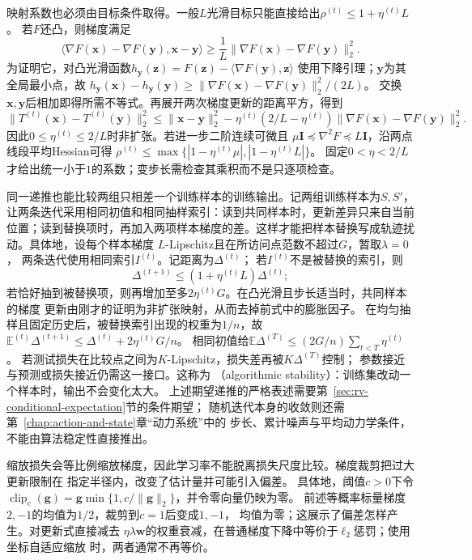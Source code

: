 映射系数也必须由目标条件取得。一般$L$光滑目标只能直接给出$\rho^{(t)}\leq1+\eta^{(t)}L$。
若$F$还凸，则梯度满足
\[
 \langle\nabla F(\bm x)-\nabla F(\bm y),\bm x-\bm y\rangle
 \geq\frac1L\|\nabla F(\bm x)-\nabla F(\bm y)\|_2^2.
\]
为证明它，对凸光滑函数$h_{\bm y}(\bm z)=F(\bm z)-\langle\nabla F(\bm y),\bm z\rangle$
使用下降引理；$\bm y$为其全局最小点，故
$h_{\bm y}(\bm x)-h_{\bm y}(\bm y)\geq
\|\nabla F(\bm x)-\nabla F(\bm y)\|_2^2/(2L)$。
交换$\bm x,\bm y$后相加即得所需不等式。再展开两次梯度更新的距离平方，得到
\[
 \|T^{(t)}(\bm x)-T^{(t)}(\bm y)\|_2^2
 \leq\|\bm x-\bm y\|_2^2
 -\eta^{(t)}(2/L-\eta^{(t)})\|\nabla F(\bm x)-\nabla F(\bm y)\|_2^2.
\]
因此$0\leq\eta^{(t)}\leq2/L$时非扩张。若进一步二阶连续可微且
$\mu\bm I\preceq\nabla^2F\preceq L\bm I$，沿两点线段平均Hessian可得
$\rho^{(t)}\leq\max\{|1-\eta^{(t)}\mu|,|1-\eta^{(t)}L|\}$。
固定$0<\eta<2/L$才给出统一小于$1$的系数；变步长需检查其乘积而不是只逐项检查。

同一递推也能比较两组只相差一个训练样本的训练输出。记两组训练样本为$S,S'$，让两条迭代采用相同初值和相同抽样索引：读到共同样本时，更新差异只来自当前位置；读到替换项时，再加入两项样本梯度的差。这样才能把样本替换写成轨迹扰动。具体地，设每个样本梯度
$L$-Lipschitz且在所访问点范数不超过$G$，暂取$\lambda=0$，
两条迭代使用相同索引$I^{(t)}$。记距离为$\Delta^{(t)}$；
若$I^{(t)}$不是被替换的索引，则
\[
  \Delta^{(t+1)}\leq(1+\eta^{(t)}L)\Delta^{(t)};
\]
若恰好抽到被替换项，则再增加至多$2\eta^{(t)}G$。在凸光滑且步长适当时，共同样本的梯度
更新由刚才的证明为非扩张映射，从而去掉前式中的膨胀因子。
在均匀抽样且固定历史后，被替换索引出现的权重为$1/n$，故
$\mathbb E^{(t)}\Delta^{(t+1)}\leq\Delta^{(t)}+2\eta^{(t)}G/n$。
相同初值给$\mathbb E\Delta^{(T)}\leq(2G/n)\sum_{t<T}\eta^{(t)}$。
若测试损失在比较点之间为$K$-Lipschitz，损失差再被$K\Delta^{(T)}$控制；
参数接近与预测或损失接近仍需这一接口。这称为
（algorithmic stability）：训练集改动一个样本时，输出不会变化太大。
上述期望递推的严格表述需要第~\ref{sec:rv-conditional-expectation}节的条件期望；
随机迭代本身的收敛则还需第~\ref{chap:action-and-state}章“动力系统”中的
步长、累计噪声与平均动力学条件，不能由算法稳定性直接推出。

缩放损失会等比例缩放梯度，因此学习率不能脱离损失尺度比较。梯度裁剪把过大更新限制在
指定半径内，改变了估计量并可能引入偏差。
具体地，阈值$c>0$下令
$\operatorname{clip}_c(\bm g)=\bm g\min\{1,c/\|\bm g\|_2\}$，并令零向量仍映为零。
前述等概率标量梯度$2,-1$的均值为$1/2$，裁剪到$c=1$后变成$1,-1$，
均值为零；这展示了偏差怎样产生。对更新式直接减去
$\eta\lambda\bm{w}$的权重衰减，在普通梯度下降中等价于$\ell_2$惩罚；使用坐标自适应缩放
时，两者通常不再等价。

